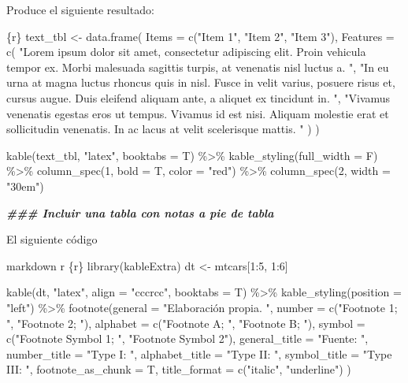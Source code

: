 \documentclass[11pt,a4paper,oneside,]{article}
\newenvironment{Shaded}{\begin{snugshade}}{\end{snugshade}}
\newcommand{\AttributeTok}[1]{\textcolor[rgb]{0.77,0.63,0.00}{#1}}
\newcommand{\DocumentationTok}[1]{\textcolor[rgb]{0.56,0.35,0.01}{\textbf{\textit{#1}}}}
\newcommand{\NormalTok}[1]{#1}
\newcommand{\SpecialCharTok}[1]{\textcolor[rgb]{0.00,0.00,0.00}{#1}}
\newcommand{\StringTok}[1]{\textcolor[rgb]{0.31,0.60,0.02}{#1}}
\numberwithin{dummy}{section}
\theoremstyle{ocrenumbox}
\theoremstyle{blacknumex}
\theoremstyle{blacknumbox}
\theoremstyle{ocrenum}
\theoremstyle{ocrenum}
\begin{document}
\begin{Shaded}
\begin{Highlighting}[numbers=left,,]
\StringTok{\textasciigrave{}\textasciigrave{}\textasciigrave{}\textasciigrave{}}


\NormalTok{Produce el siguiente resultado}\SpecialCharTok{:}

\StringTok{\textasciigrave{}\textasciigrave{}\textasciigrave{}}\AttributeTok{\{r\}}
\AttributeTok{text\_tbl \textless{}{-} data.frame(}
\AttributeTok{  Items = c("Item 1", "Item 2", "Item 3"), }
\AttributeTok{  Features = c(}
\AttributeTok{    "Lorem ipsum dolor sit amet, consectetur adipiscing elit.}
\AttributeTok{    Proin vehicula tempor ex. Morbi malesuada sagittis turpis,}
\AttributeTok{    at venenatis nisl luctus a. ",}
\AttributeTok{    "In eu urna at magna luctus rhoncus quis in nisl. Fusce in velit}
\AttributeTok{    varius, posuere risus et, cursus augue. Duis eleifend aliquam ante,}
\AttributeTok{    a aliquet ex tincidunt in. ",}
\AttributeTok{    "Vivamus venenatis egestas eros ut tempus. Vivamus id est nisi.}
\AttributeTok{    Aliquam molestie erat et sollicitudin venenatis. In ac lacus at}
\AttributeTok{    velit scelerisque mattis. "}
\AttributeTok{    ) }
\AttributeTok{  )}

\AttributeTok{kable(text\_tbl, "latex", booktabs = T) \%\textgreater{}\% }
\AttributeTok{  kable\_styling(full\_width = F) \%\textgreater{}\% }
\AttributeTok{  column\_spec(1, bold = T, color = "red") \%\textgreater{}\% }
\AttributeTok{  column\_spec(2, width = "30em")}
\StringTok{\textasciigrave{}\textasciigrave{}\textasciigrave{}}


\DocumentationTok{\#\#\# Incluir una tabla con notas a pie de tabla}

\NormalTok{El siguiente código }

\StringTok{\textasciigrave{}\textasciigrave{}\textasciigrave{}\textasciigrave{}}\NormalTok{markdown}
\StringTok{\textasciigrave{}}\AttributeTok{r \textquotesingle{}\textquotesingle{}}\StringTok{\textasciigrave{}\textasciigrave{}\textasciigrave{}\textasciigrave{}}\AttributeTok{\{r\}}
\AttributeTok{library(kableExtra)}
\AttributeTok{dt \textless{}{-} mtcars[1:5, 1:6]}

\AttributeTok{kable(dt, "latex", align = "cccrcc", booktabs = T) \%\textgreater{}\%}
\AttributeTok{    kable\_styling(position = "left") \%\textgreater{}\% }
\AttributeTok{    footnote(general = "Elaboración propia. ",}
\AttributeTok{             number = c("Footnote 1; ", "Footnote 2; "),}
\AttributeTok{             alphabet = c("Footnote A; ", "Footnote B; "),}
\AttributeTok{             symbol = c("Footnote Symbol 1; ", "Footnote Symbol 2"), }
\AttributeTok{             general\_title = "Fuente: ", }
\AttributeTok{             number\_title = "Type I: ", }
\AttributeTok{             alphabet\_title = "Type II: ", }
\AttributeTok{             symbol\_title = "Type III: ", }
\AttributeTok{             footnote\_as\_chunk = T, }
\AttributeTok{             title\_format = c("italic", "underline") )}
\StringTok{\textasciigrave{}\textasciigrave{}\textasciigrave{}}


\end{Highlighting}
\end{Shaded}
\end{document}
